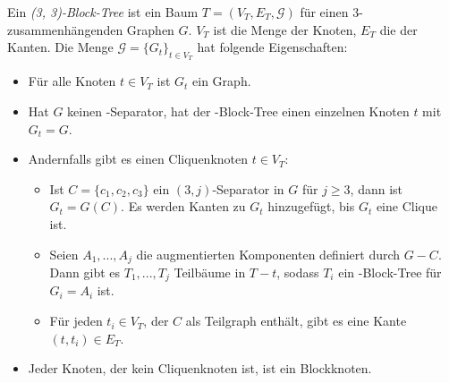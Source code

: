 \begin{definition}
Ein \emph{(3, 3)-Block-Tree} ist ein Baum $T = (V_T, E_T, \mathcal{G})$ für einen $3$-zusammenhängenden Graphen $G$.
$V_T$ ist die Menge der Knoten, $E_T$ die der Kanten.
Die Menge $\mathcal{G} = \{G_t\}_{t \in V_T}$ hat folgende Eigenschaften:
\begin{itemize}
  \item Für alle Knoten $t \in V_T$ ist $G_t$ ein Graph.
  \item Hat $G$ keinen \dd-Separator, hat der \dd-Block-Tree einen einzelnen Knoten $t$ mit $G_t = G$.
  \item Andernfalls gibt es einen Cliquenknoten $t \in V_T$:
  \begin{itemize}
    \item Ist $C = \{c_1, c_2, c_3\}$ ein $(3, j)$-Separator in $G$ für $j \geq 3$, dann ist $G_t = G(C)$.
          Es werden Kanten zu $G_t$ hinzugefügt, bis $G_t$ eine Clique ist.
    \item Seien $A_1, ..., A_j$ die augmentierten Komponenten definiert durch $G - C$.
          Dann gibt es $T_1, ..., T_j$ Teilbäume in $T - t$, sodass $T_i$ ein \dd-Block-Tree für $G_i = A_i$ ist.
    \item Für jeden $t_i \in V_T$, der $C$ als Teilgraph enthält, gibt es eine Kante $(t, t_i) \in E_T$.
  \end{itemize}
  \item Jeder Knoten, der kein Cliquenknoten ist, ist ein Blockknoten.
\end{itemize}
\end{definition}

